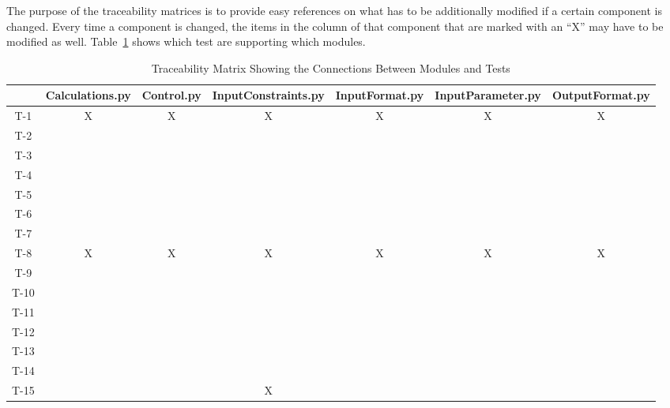 \documentclass[12pt, titlepage]{article}
\begin{document}
The purpose of the traceability matrices is to provide easy references on what
has to be additionally modified if a certain component is changed.  Every time a
component is changed, the items in the column of that component that are marked
with an ``X'' may have to be modified as well.  Table~\ref{Table:M_trace} shows 
which test are supporting which modules.

\begin{landscape}
\begin{table}[ht]
\centering
\begin{tabular}{||c||c|c|c|c|c|c||}
\hline
	& Calculations.py & Control.py & InputConstraints.py & InputFormat.py & 
InputParameter.py & OutputFormat.py \\
\hline
T-1        	&X &X &X &X &X &X  \\
\hline
T-2			& & & & & &  \\
\hline
T-3        	& & & & & &  \\
\hline
T-4			& & & & & &  \\
\hline
T-5        	& & & & & &  \\
\hline
T-6			& & & & & &  \\
\hline
T-7			& & & & & &  \\
\hline
T-8			&X &X &X &X &X &X  \\
\hline
T-9			& & & & & &  \\
\hline
T-10			& & & & & &  \\
\hline
T-11			& & & & & &  \\
\hline
T-12			& & & & & &  \\
\hline
T-13			& & & & & &  \\
\hline
T-14			& & & & & &  \\
\hline
T-15			& & &X & & &  \\
\hline
\end{tabular}
\caption{Traceability Matrix Showing the Connections Between Modules and 
Tests}
\label{Table:M_trace}
\end{table}
\end{landscape}	




~\newpage
\end{document}
